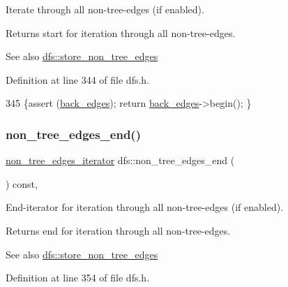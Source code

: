 Iterate through all non-\/tree-\/edges (if enabled). 

\begin{DoxyReturn}{Returns}
start for iteration through all non-\/tree-\/edges. 
\end{DoxyReturn}
\begin{DoxySeeAlso}{See also}
\mbox{\hyperlink{classdfs_a6f54f1c4339eacc8961e795439d4593d}{dfs\+::store\+\_\+non\+\_\+tree\+\_\+edges}} 
\end{DoxySeeAlso}


Definition at line 344 of file dfs.\+h.


\begin{DoxyCode}
345     \{assert (\mbox{\hyperlink{classdfs_a1dc18a7df8d6b238d5301c92fc7540fa}{back\_edges}});  \textcolor{keywordflow}{return} \mbox{\hyperlink{classdfs_a1dc18a7df8d6b238d5301c92fc7540fa}{back\_edges}}->begin(); \}
\end{DoxyCode}
\mbox{\label{classdfs_ad9cd92a18bda23edca8ab3ac60a15ef4}} 
\subsubsection{\texorpdfstring{non\+\_\+tree\+\_\+edges\+\_\+end()}{non\_tree\_edges\_end()}}
{\footnotesize\ttfamily \mbox{\hyperlink{classdfs_a95e353f354d3b31daded0c4fe749171a}{non\+\_\+tree\+\_\+edges\+\_\+iterator}} dfs\+::non\+\_\+tree\+\_\+edges\+\_\+end (\begin{DoxyParamCaption}{ }\end{DoxyParamCaption}) const\hspace{0.3cm}{\ttfamily [inline]}, {\ttfamily [inherited]}}



End-\/iterator for iteration through all non-\/tree-\/edges (if enabled). 

\begin{DoxyReturn}{Returns}
end for iteration through all non-\/tree-\/edges. 
\end{DoxyReturn}
\begin{DoxySeeAlso}{See also}
\mbox{\hyperlink{classdfs_a6f54f1c4339eacc8961e795439d4593d}{dfs\+::store\+\_\+non\+\_\+tree\+\_\+edges}} 
\end{DoxySeeAlso}


Definition at line 354 of file dfs.\+h.


